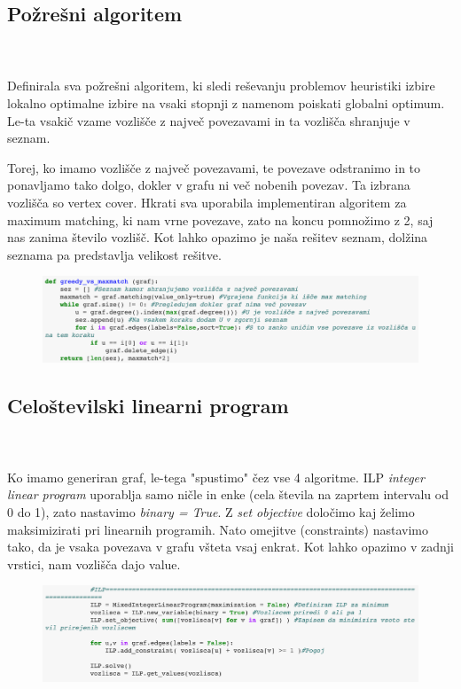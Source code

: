 \documentclass[12pt,a4paper]{amsart}
\theoremstyle{definition} %
\theoremstyle{plain} %
\begin{document}
\newpage

\subsection{Požrešni algoritem}
\
\\
\\
Definirala sva požrešni algoritem, ki sledi reševanju problemov heuristiki izbire lokalno optimalne izbire na vsaki stopnji z namenom poiskati globalni optimum. Le-ta vsakič vzame vozlišče z največ povezavami in ta vozlišča shranjuje v seznam. 

Torej, ko imamo vozlišče z največ povezavami, te povezave odstranimo in to ponavljamo tako dolgo, dokler v grafu ni več nobenih povezav. Ta izbrana vozlišča so vertex cover. Hkrati sva uporabila implementiran algoritem za maximum matching, ki nam vrne povezave, zato na koncu pomnožimo z 2, saj nas zanima število vozlišč. Kot lahko opazimo je naša rešitev seznam, dolžina seznama pa predstavlja velikost rešitve. 

\begin{figure}[ht]
\centering
\includegraphics[width=1\textwidth]{Screen1.png}
\end{figure}




\subsection{Celoštevilski linearni program}
\
\\
\\
Ko imamo generiran graf, le-tega "spustimo" čez vse 4 algoritme. 
ILP \textit{integer linear program } uporablja samo ničle in enke (cela števila na zaprtem intervalu od 0 do 1), zato nastavimo \textit{binary = True}. Z \textit{set objective} določimo kaj želimo maksimizirati pri linearnih programih. Nato omejitve (constraints) nastavimo tako, da je vsaka povezava v grafu všteta vsaj enkrat. Kot lahko opazimo v zadnji vrstici, nam vozlišča dajo value. 



\begin{figure}[ht]
\centering
\includegraphics[width=1\textwidth]{Screen4.png}
\end{figure}
\end{document}
